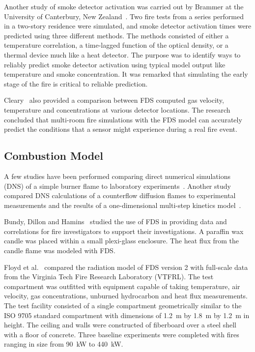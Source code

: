 Another study of smoke detector activation was carried out by Brammer at the University of Canterbury, New Zealand~\cite{Brammer:1}. Two fire tests from a series performed in a two-story residence were simulated, and smoke detector activation times were predicted using three different methods. The methods consisted of either a temperature correlation, a time-lagged function of the optical density, or a thermal device much like a heat detector. The purpose was to identify ways to reliably predict smoke detector activation using typical model output like temperature and smoke concentration. It was remarked that simulating the early stage of the fire is critical to reliable prediction.

Cleary~\cite{Cleary:1} also provided a comparison between FDS computed gas velocity, temperature and concentrations at various detector locations.  The research concluded that multi-room fire simulations with the FDS model can accurately predict the conditions that a sensor might experience during a real fire event.




\subsection{Combustion Model}

A few studies have been performed comparing direct numerical simulations (DNS) of a simple burner flame to laboratory experiments~\cite{Mukhopadhyay:1}. Another study compared DNS calculations of a counterflow diffusion flames to experimental measurements and the results of a one-dimensional multi-step kinetics model~\cite{Hamins:NASA}.

Bundy, Dillon and Hamins~\cite{Dillon:1,Hamins:FPE2005} studied the use of FDS in providing data and correlations for fire investigators to support their investigations.  A paraffin wax candle was placed within a small plexi-glass enclosure. The heat flux from the candle flame was modeled with FDS.

Floyd et al.~\cite{Floyd:1,Floyd:6} compared the radiation model of FDS version 2 with full-scale data from the Virginia Tech Fire Research Laboratory (VTFRL). The test compartment was outfitted with equipment capable  of taking  temperature,  air velocity,  gas concentrations, unburned hydrocarbon and heat flux measurements. The test facility consisted of a single compartment geometrically similar to the ISO 9705 standard compartment with dimensions of 1.2~m by 1.8~m by 1.2~m in height.  The ceiling and walls were constructed of fiberboard over a steel shell with a floor of concrete.  Three baseline experiments were completed with fires ranging in size from 90~kW to 440~kW.

